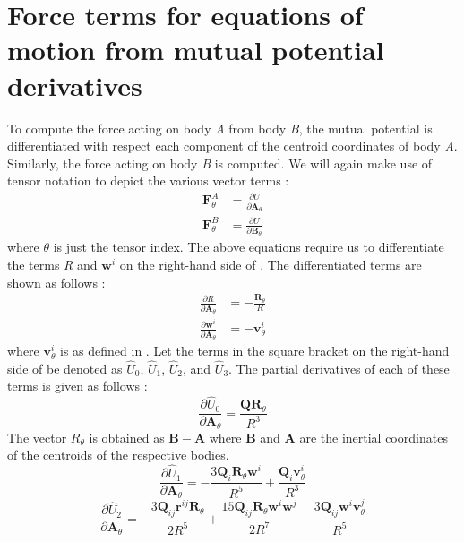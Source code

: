 \section{Force terms for equations of motion from mutual potential derivatives}
\label{force_terms}
To compute the force acting on body \textit{A} from body \textit{B}, the mutual potential is differentiated with respect each component of the centroid coordinates of body \textit{A}. Similarly, the force acting on body \textit{B} is computed. We will again make use of tensor notation to depict the various vector terms \cite{fahn_poly}:
\begin{align}
\mathbf{F}_\theta^A &= \frac{\partial U}{\partial \mathbf{A}_\theta} \\
\mathbf{F}_\theta^B &= \frac{\partial U}{\partial \mathbf{B}_\theta}
\end{align}
%
where $\theta$ is just the tensor index. The above equations require us to differentiate the terms \textit{R} and $\textbf{w}^i$ on the right-hand side of . The differentiated terms are shown as follows \cite{fahn_poly}:
\begin{align}
\label{R_diff}
\frac{\partial R}{\partial \mathbf{A}_\theta} &= -\frac{\mathbf{R}_\theta}{R}\\
\label{w_diff}
\frac{\partial \mathbf{w}^i}{\partial \mathbf{A}_\theta} &= -\mathbf{v}_\theta^i
\end{align}
%
where $\mathbf{v}_\theta^i$ is as defined in . Let the terms in the square bracket on the right-hand side of  be denoted as $\hat{U}_0$, $\hat{U}_1$, $\hat{U}_2$, and $\hat{U}_3$. The partial derivatives of each of these terms is given as follows \cite{fahn_poly}:
\begin{equation}
\label{u0_diff}
\frac{\partial \hat{U}_0}{\partial \mathbf{A}_\theta} = \frac{\mathbf{Q} \mathbf{R}_\theta}{R^3}
\end{equation}
%
The vector $R_\theta$ is obtained as $\mathbf{B} - \mathbf{A}$ where \textbf{B} and \textbf{A} are the inertial coordinates of the centroids of the respective bodies.
\begin{equation}
\label{u1_diff}
\frac{\partial \hat{U}_1}{\partial \mathbf{A}_\theta} = -\frac{3\mathbf{Q}_i \mathbf{R}_\theta \mathbf{w}^i}{R^5} + \frac{\mathbf{Q}_i \mathbf{v}_\theta^i}{R^3}
\end{equation}
%
\begin{equation}
\label{u2_diff}
\frac{\partial \hat{U}_2}{\partial \mathbf{A}_\theta} = -\frac{3\mathbf{Q}_{ij} \mathbf{r}^{ij} \mathbf{R}_\theta}{2R^5} + \frac{15\mathbf{Q}_{ij} \mathbf{R}_\theta \mathbf{w}^i \mathbf{w}^j}{2R^7} - \frac{3\mathbf{Q}_{ij} \mathbf{w}^i \mathbf{v}_\theta^j}{R^5}
\end{equation}

